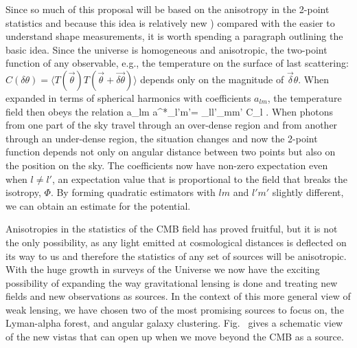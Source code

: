 Since so much of this proposal will be based on the anisotropy in the 2-point statistics and because this idea is relatively new \citep{Hu:2001tn}) compared with the easier to understand shape measurements, it is worth spending a paragraph outlining the basic idea. Since the universe is homogeneous and anisotropic, the two-point function of any observable, e.g., the temperature on the surface of last scattering: $C(\delta\theta)=\langle T(\vec \theta)T(\vec\theta+\vec{\delta\theta})\rangle$ depends only on the magnitude of $\vec\delta\theta$. When expanded in terms of spherical harmonics with coefficients $a_{lm}$, the temperature field then obeys the relation
\be
\langle a_{lm} a^*_{l'm'}\rangle = \delta_{ll'}\delta_{mm'} C_l
.\ee
When photons from one part of the sky travel through an over-dense region and from another through an under-dense region, the situation changes and now the 2-point function depends not only on angular distance between two points but also on the position on the sky. The coefficients now have non-zero expectation even when $l\ne l'$, an expectation value that is proportional to the field that breaks the isotropy, $\Phi$. By forming quadratic estimators with $lm$ and $l'm'$ slightly different, we can obtain an estimate for the potential. 
 
Anisotropies in the statistics of the CMB field has proved fruitful, but it is not the only possibility, as any light emitted
at cosmological distances is deflected on its way to us and therefore the statistics of any set of sources will be anisotropic. With the huge
growth in surveys of the Universe we now have the exciting possibility
of expanding the way gravitational lensing is done and treating new
fields and new observations as sources. In the context of this more general
view of weak lensing, we have chosen two of the most
promising sources to focus on, the Lyman-alpha forest, and 
angular galaxy clustering. Fig.~ gives a schematic view of the new vistas that can open up when we move beyond the CMB as a source.


